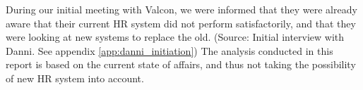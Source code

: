 During our initial meeting with Valcon, we were informed that they were already aware that their current HR system did not perform satisfactorily, and that they were looking at new systems to replace the old. (Source: Initial interview with Danni. See appendix \ref{app:danni_initiation})
The analysis conducted in this report is based on the current state of affairs, and thus not taking the possibility of new HR system into account.